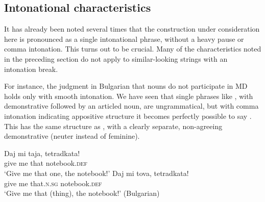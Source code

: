 \documentclass[output=paper,
colorlinks,
citecolor=brown,
newtxmath
]{langscibook}
\begin{document}
\subsection{Intonational characteristics} \label{intonation}

It has already been noted several times that the construction under consideration here is pronounced as a single intonational phrase, without a heavy pause or comma intonation. This turns out to be crucial. Many of the characteristics noted in the preceding section do not apply to similar-looking strings with an intonation break.

For instance, the judgment in Bulgarian that nouns do not participate in MD holds only with smooth intonation. We have seen that single phrases like , with demonstrative followed by an articled noun, are ungrammatical, but with comma intonation indicating appositive structure it becomes perfectly possible to say . This has the same structure as , with a clearly separate, non-agreeing demonstrative (neuter instead of feminine).

\z


\ea
\ea \label{notebook2}
\gll Daj mi taja, tetradkata! \\
    give me that notebook.\textsc{def} \\
\glt `Give me that one, the notebook!'
\ex \label{notebook3}
\gll Daj mi tova, tetradkata! \\
    give me that.\textsc{n.sg} notebook.\textsc{def} \\
\glt `Give me that (thing), the notebook!' \hfill (Bulgarian)
\z
\z
\end{document}
